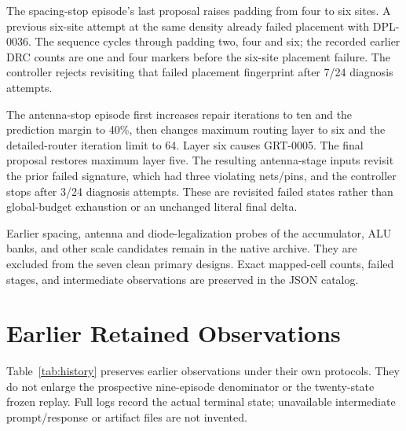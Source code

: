 \documentclass[runningheads]{llncs}
\begin{document}
The spacing-stop episode's last proposal raises padding from four to six
sites. A previous six-site attempt at the same density already failed
placement with DPL-0036. The sequence cycles through padding two, four and six;
the recorded earlier DRC counts are one and four markers before the six-site
placement failure. The controller rejects revisiting that failed placement
fingerprint after 7/24 diagnosis attempts.

The antenna-stop episode first increases repair iterations to ten and the
prediction margin to 40\%, then changes maximum routing layer to six and
the detailed-router iteration limit to 64. Layer six causes GRT-0005. The final proposal restores
maximum layer five. The resulting antenna-stage inputs revisit the prior
failed signature, which had three violating nets/pins, and the controller
stops after 3/24 diagnosis attempts. These are revisited failed states rather
than global-budget exhaustion or an unchanged literal final delta.

Earlier spacing, antenna and diode-legalization probes of the accumulator,
ALU banks, and other scale candidates remain in the native archive. They
are excluded from the seven clean primary designs. Exact mapped-cell counts,
failed stages, and intermediate observations are preserved in the JSON catalog.

\section{Earlier Retained Observations}
Table~\ref{tab:history} preserves earlier observations under their own
protocols. They do not enlarge the prospective nine-episode denominator or
the twenty-state frozen replay. Full logs record the actual terminal state;
unavailable intermediate prompt/response or artifact files are not invented.


\FloatBarrier
\end{document}
